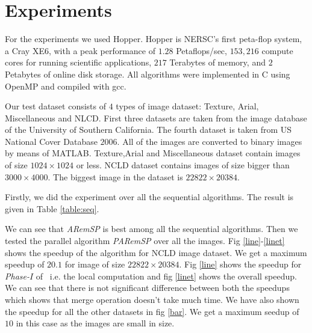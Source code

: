 \section{Experiments}
\label{sec:experiments}



For the experiments we used Hopper. Hopper is NERSC's first peta-flop system, a
Cray XE6, with a peak performance of $1.28$ Petaflops/sec, $153,216$ compute
cores for running scientific applications, $217$ Terabytes of memory, and $2$
Petabytes of online disk storage. All algorithms were implemented in C using OpenMP and compiled with gcc.

Our test dataset consists of $4$ types of image dataset: Texture, Arial,
Miscellaneous and NLCD. First three datasets are taken from the image database of the University of 
Southern California. The fourth dataset is taken from US National Cover Database
$2006$. All of the images are converted to binary images by means of MATLAB.
Texture,Arial and Miscellaneous dataset contain images of size $1024 \times
1024$ or less.
NCLD dataset contains images of size bigger than $3000 \times
4000$. The biggest image in the dataset is $22822 \times 20384$.

Firstly, we did the experiment over all the sequential algorithms. The result is given in Table \ref{table:seq}. 

We can see that {\em ARemSP} is best among all
the sequential algorithms. Then we tested the parallel algorithm {\em PARemSP} over all the images. 
Fig \ref{line}-\ref{linet} shows the speedup of the algorithm for 
NCLD image dataset. We get a maximum speedup of $20.1$ for image of size $22822 \times 20384$. 
Fig \ref{line} shows the speedup for {\em Phase-$I$} of \paremsp\ i.e. 
the local computation and fig \ref{linet} shows the overall speedup. We can see that there is not 
significant difference between both the speedups which shows that 
merge operation doesn't take much time. We have also shown the speedup for all
the other datasets in fig \ref{bar}. We get a maximum seedup of $10$ in this case as the images are small in size.  


